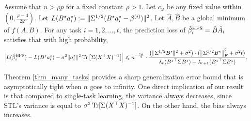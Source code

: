 \begin{theorem}\label{thm_many_tasks}
	Assume that $n > \rho p$ for a fixed constant $\rho > 1$.
	Let $c_{\varphi}$ be any fixed value within $(0, \frac{\varphi-4}{2\varphi})$.
	Let $L(B^{\star}a_i^{\star}): = \|\Sigma^{1/2} (B^{\star} a_i^{\star}- \beta^{(i)})\|^2$.
	Let $\hat{A}, \hat{B}$ be a global minimum of $f(A, B)$.
	For any task $i = 1, 2, \dots, t$, the prediction loss of $\hat{\beta}_i^{\textup{HPS}} = \hat{B} \hat{A}_i$ satisfies that with high probability,
	\begin{align*}
		{\left| {L(\hat{\beta}_i^{\textup{HPS}}) - L(B^{\star}a_i^{\star}) - \sigma^2 \|a_i^{\star}\|^2 \operatorname{Tr}\left[\Sigma (X^{\top}X)^{-1}\right]} \right|}
		\leqslant n^{-\frac{c_{\varphi}}2} \cdot \frac{\left({ \|\Sigma^{1/2} B^{\star}\|^2+  \sigma^2}\right) \cdot (\left\| \Sigma^{1/2} B^{\star} \right\|_{F}^2 + \sigma^2 t)} {\lambda_r ({B^\star}^\top \Sigma B^\star)- \lambda_{r+1}({B^\star}^\top \Sigma B^\star)},
	\end{align*}
\end{theorem}

Theorem \ref{thm_many_tasks} provides a sharp generalization error bound that is asymptotically tight when $n$ goes to infinity.
One direct implication of our result is that compared to single-task learning, the variance always decreases, since STL's variance is equal to $\sigma^2 \operatorname{Tr}[\Sigma (X^{\top} X)^{-1}]$.
On the other hand, the bias always increases.


